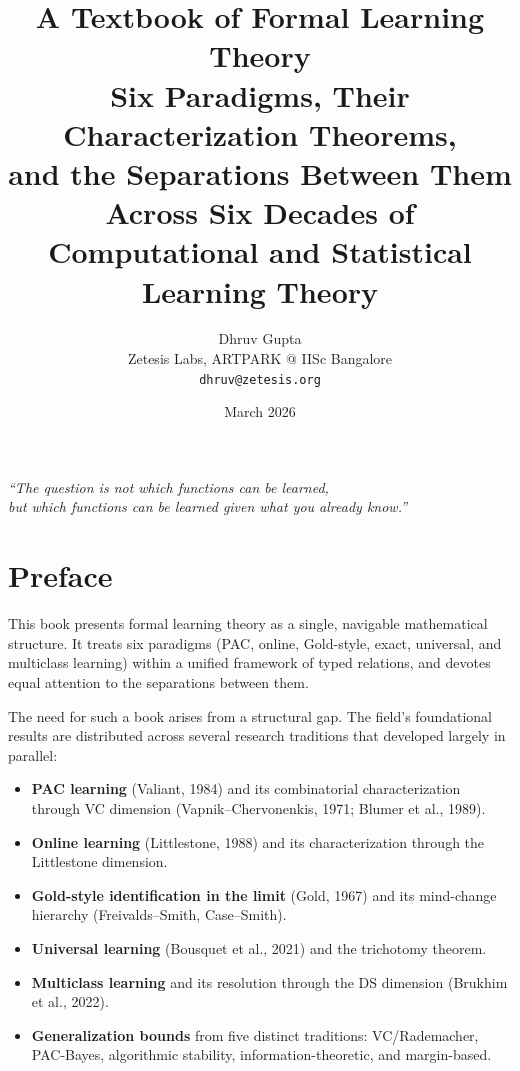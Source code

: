 \documentclass[11pt,a4paper,twoside,openright]{book}
\title{%
  \textbf{\Huge A Textbook of Formal Learning Theory}\\[1em]
  \Large Six Paradigms, Their Characterization Theorems,\\
  and the Separations Between Them\\[1em]
  \large Across Six Decades of Computational and Statistical Learning Theory
}
\author{%
  Dhruv Gupta\\
  Zetesis Labs, ARTPARK @ IISc Bangalore\\
  \texttt{dhruv@zetesis.org}
}
\date{March 2026}
\theoremstyle{definition}
\theoremstyle{plain}
\theoremstyle{remark}
\begin{document}

\frontmatter
\maketitle

\thispagestyle{empty}
\vspace*{\fill}
\begin{center}
\begin{minipage}{0.7\textwidth}
\centering\itshape\large
``The question is not which functions can be learned,\\
but which functions can be learned \emph{given what you already know}.''
\end{minipage}
\end{center}
\vspace*{\fill}
\newpage

\chapter*{Preface}

This book presents formal learning theory as a single, navigable mathematical structure.  It treats six paradigms (PAC, online, Gold-style, exact, universal, and multiclass learning) within a unified framework of typed relations, and devotes equal attention to the separations between them.

The need for such a book arises from a structural gap. The field's foundational results are distributed across several research traditions that developed largely in parallel:

\begin{itemize}[leftmargin=*]
\item \textbf{PAC learning} (Valiant, 1984) and its combinatorial characterization through VC dimension (Vapnik--Chervonenkis, 1971; Blumer et al., 1989).
\item \textbf{Online learning} (Littlestone, 1988) and its characterization through the Littlestone dimension.
\item \textbf{Gold-style identification in the limit} (Gold, 1967) and its mind-change hierarchy (Freivalds--Smith, Case--Smith).
\item \textbf{Universal learning} (Bousquet et al., 2021) and the trichotomy theorem.
\item \textbf{Multiclass learning} and its resolution through the DS dimension (Brukhim et al., 2022).
\item \textbf{Generalization bounds} from five distinct traditions: VC/Rademacher, PAC-Bayes, algorithmic stability, information-theoretic, and margin-based.
\end{itemize}
\end{document}
